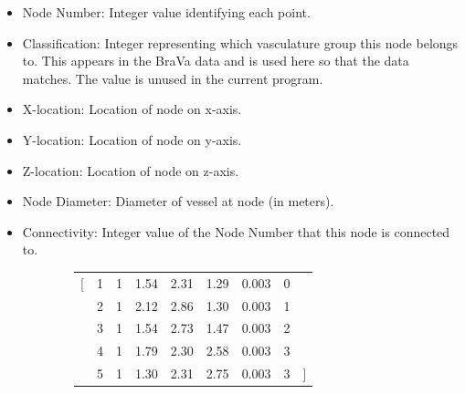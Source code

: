 \documentclass[11pt,english,a4paper,twoside,openright]{report}
\begin{document}
{{{{{{{{\begin{itemize}
	\setlength\itemsep{0em}
	\item Node Number: Integer value identifying each point.
	\item Classification: Integer representing which vasculature group this node belongs to. This appears in the BraVa data and is used here so that the data matches. The value is unused in the current program.
	\item X-location: Location of node on x-axis.
	\item Y-location: Location of node on y-axis.
	\item Z-location: Location of node on z-axis.
	\item Node Diameter: Diameter of vessel at node (in meters).
	\item Connectivity: Integer value of the Node Number that this node is connected to.
\end{itemize}

\begin{figure}
	
	\begin{subfigure}[c]{0.48\textwidth}
		\centering
		\fontsize{8pt}{9pt}\selectfont
		\begin{tabular}{c c c c c c c c c}
			[ & 1 & 1 & 1.54 & 2.31 & 1.29 & 0.003 & 0 &  \\
			& 2 & 1 & 2.12 & 2.86 & 1.30 & 0.003 & 1 &  \\
			& 3 & 1 & 1.54 & 2.73 & 1.47 & 0.003 & 2 &  \\
			& 4 & 1 & 1.79 & 2.30 & 2.58 & 0.003 & 3 &  \\
			& 5 & 1 & 1.30 & 2.31 & 2.75 & 0.003 & 3 & ] \\
		\end{tabular}
	\end{subfigure} 
	\begin{subfigure}[c]{0.50\textwidth}
		\centering
	\end{subfigure}
	

\end{figure}}}}}}}}}
\end{document}
